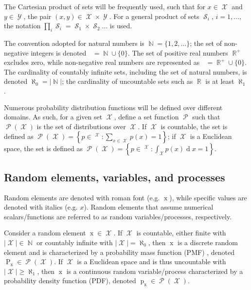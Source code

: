 \documentclass[12pt]{report}
\newcommand{\todolo}[1]{\todo[inline,color=green!50,linecolor=red]{#1}}
\DeclareMathOperator{\xrm}{\mathrm{x}}
\DeclareMathOperator{\Prm}{\mathrm{P}}
\DeclareMathOperator{\prm}{\mathrm{p}}
\DeclareMathOperator{\drm}{\mathrm{d}}
\DeclareMathOperator{\Xcal}{\mathcal{X}}
\DeclareMathOperator{\Ycal}{\mathcal{Y}}
\DeclareMathOperator{\Scal}{\mathcal{S}}
\DeclareMathOperator{\Pcal}{\mathcal{P}}
\DeclareMathOperator{\Rbb}{\mathbb{R}}
\DeclareMathOperator{\Rbbgeq}{\mathbb{R}_{\geq 0}}
\DeclareMathOperator{\Nbb}{\mathbb{N}}
\DeclareMathOperator{\Zbbgeq}{\mathbb{Z}_{\geq 0}}
\begin{document}
The Cartesian product of sets will be frequently used, such that for $x \in \Xcal$ and $y \in \Ycal$, the pair $(x,y) \in \Xcal \times \Ycal$. For a general product of sets $\Scal_i$, $i = 1,\ldots$, the notation $\prod_i \Scal_i = \Scal_1 \times \Scal_2 \ldots$ is used.

The convention adopted for natural numbers is $\Nbb = \{1,2,\ldots\}$; the set of non-negative integers is denoted $\Zbbgeq = \Nbb \cup \{0\}$. The set of positive real numbers $\Rbb^+$ excludes zero, while non-negative real numbers are represented as $\Rbbgeq = \Rbb^+ \cup \{0\}$. The cardinality of countably infinite sets, including the set of natural numbers, is denoted $\aleph_0 = |\Nbb|$; the cardinality of uncountable sets such as $\Rbb$ is at least $\aleph_1$.

Numerous probability distribution functions will be defined over different domains. As such, for a given set $\Xcal$, define a set function $\Pcal$ such that $\Pcal(\Xcal)$ is the set of distributions over $\Xcal$. If $\Xcal$ is countable, the set is defined as $\Pcal(\Xcal) = \left\{ p \in {\Rbbgeq}^{\Xcal}: \sum_{x \in \Xcal} p(x) = 1 \right\}$; if $\Xcal$ is a Euclidean space, the set is defined as $\Pcal(\Xcal) = \left\{ p \in {\Rbbgeq}^{\Xcal}: \int_{\Xcal} p(x) {\drm}x = 1 \right\}$.

\todolo{aleph reference?}





\subsection*{Random elements, variables, and processes}

Random elements are denoted with roman font (e.g. $\xrm$), while specific values are denoted with italics (e.g. $x$). Random elements that assume numerical scalars/functions are referred to as random variables/processes, respectively.

Consider a random element $\xrm \in \Xcal$. If $\Xcal$ is countable, either finite with $|\Xcal| \in \Nbb$ or countably infinite with $|\Xcal| = \aleph_0$, then $\xrm$ is a discrete random element and is characterized by a probability mass function (PMF) \cite {papoulis}, denoted $\Prm_{\xrm} \in \Pcal(\Xcal)$. If $\Xcal$ is a Euclidean space and is thus uncountable with $|\Xcal| \geq \aleph_1$, then $\xrm$ is a continuous random variable/process characterized by a probability density function (PDF), denoted $\prm_{\xrm} \in \Pcal(\Xcal)$.
\end{document}
